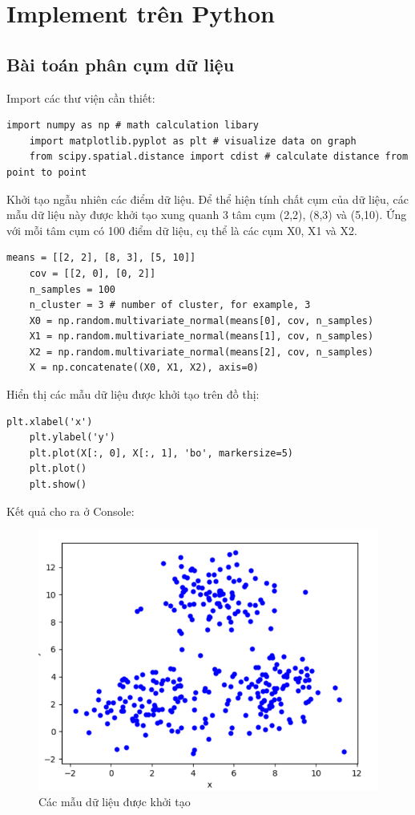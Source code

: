 \documentclass{article}
\begin{document}
	\section{Implement trên Python}
	\subsection{Bài toán phân cụm dữ liệu}
	Import các thư viện cần thiết:
	\begin{lstlisting}[style=myPythonStyle]
	import numpy as np # math calculation libary
	import matplotlib.pyplot as plt # visualize data on graph
	from scipy.spatial.distance import cdist # calculate distance from point to point
	\end{lstlisting}
	Khởi tạo ngẫu nhiên các điểm dữ liệu. Để thể hiện tính chất cụm của dữ liệu, các mẫu dữ liệu này được khởi tạo xung quanh 3 tâm cụm (2,2), (8,3) và (5,10). Ứng với mỗi tâm cụm có 100 điểm dữ liệu, cụ thể là các cụm X0, X1 và X2.
	\begin{lstlisting}[style=myPythonStyle]
	means = [[2, 2], [8, 3], [5, 10]]
	cov = [[2, 0], [0, 2]]
	n_samples = 100
	n_cluster = 3 # number of cluster, for example, 3
	X0 = np.random.multivariate_normal(means[0], cov, n_samples)
	X1 = np.random.multivariate_normal(means[1], cov, n_samples)
	X2 = np.random.multivariate_normal(means[2], cov, n_samples)
	X = np.concatenate((X0, X1, X2), axis=0)
	\end{lstlisting}
	Hiển thị các mẫu dữ liệu được khởi tạo trên đồ thị:
	\begin{lstlisting}[style=myPythonStyle]
	plt.xlabel('x')
	plt.ylabel('y')
	plt.plot(X[:, 0], X[:, 1], 'bo', markersize=5)
	plt.plot()
	plt.show()
	\end{lstlisting}
	Kết quả cho ra ở Console:
	\begin{figure}[h]
		\centering
		\includegraphics[width=0.6\linewidth]{img/py_ex_1}
		\caption{Các mẫu dữ liệu được khởi tạo}
	\end{figure}\par
\end{document}
